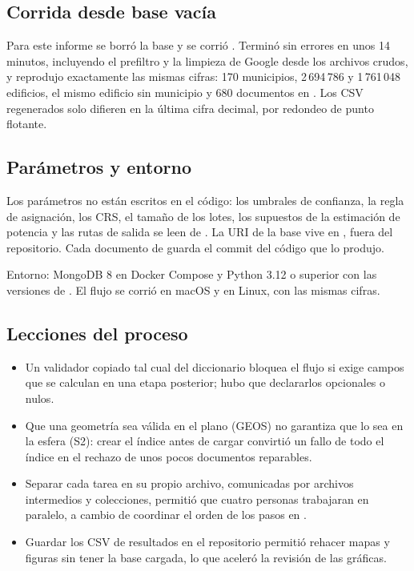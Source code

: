 \subsection{Corrida desde base vacía}

Para este informe se borró la base  y se corrió
. Terminó sin errores en unos 14 minutos, incluyendo el
prefiltro y la limpieza de Google desde los archivos crudos, y reprodujo
exactamente las mismas cifras: 170 municipios, 2\,694\,786 y 1\,761\,048
edificios, el mismo edificio sin municipio y 680 documentos en
. Los CSV regenerados solo difieren en la última cifra
decimal, por redondeo de punto flotante.


\subsection{Parámetros y entorno}

Los parámetros no están escritos en el código: los umbrales de confianza, la
regla de asignación, los CRS, el tamaño de los lotes, los supuestos de la
estimación de potencia y las rutas de salida se leen de .
La URI de la base vive en , fuera del repositorio. Cada documento
de  guarda el commit del código que lo produjo.

Entorno: MongoDB 8 en Docker Compose y Python 3.12 o superior con las
versiones de . El flujo se corrió en macOS y en Linux,
con las mismas cifras.

\subsection{Lecciones del proceso}

\begin{itemize}
  \item Un validador  copiado tal cual del diccionario
        bloquea el flujo si exige campos que se calculan en una etapa
        posterior; hubo que declararlos opcionales o nulos.
  \item Que una geometría sea válida en el plano (GEOS) no garantiza que lo
        sea en la esfera (S2): crear el índice  antes de
        cargar convirtió un fallo de todo el índice en el rechazo de unos
        pocos documentos reparables.
  \item Separar cada tarea en su propio archivo, comunicadas por archivos
        intermedios y colecciones, permitió que cuatro personas trabajaran en
        paralelo, a cambio de coordinar el orden de los pasos en
        .
  \item Guardar los CSV de resultados en el repositorio permitió rehacer
        mapas y figuras sin tener la base cargada, lo que aceleró la revisión
        de las gráficas.
\end{itemize}
